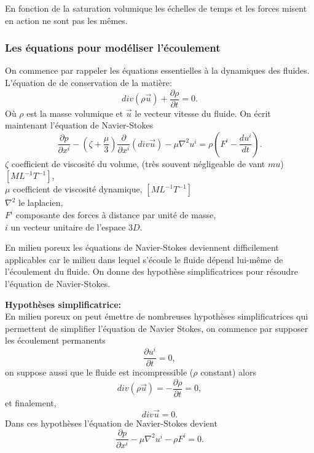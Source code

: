 \documentclass[a4paper,11pt]{article}
\begin{document}
En fonction de la saturation volumique les échelles de temps et les forces misent en action ne sont pas les mêmes.


\subsubsection{Les équations pour modéliser l'écoulement}
\label{darcy}
On commence par rappeler les équations essentielles à la dynamiques des fluides. 
L'équation de de conservation de la matière:
\begin{equation}
	\label{cons-mat}
	div(\rho \overrightarrow{u})+\frac{\partial \rho}{\partial t}=0.
\end{equation}
Où $\rho$ est la masse volumique et $\overrightarrow{u}$ le vecteur vitesse du fluide. On écrit maintenant l'équation de Navier-Stokes
\begin{equation}
	\frac{\partial p}{\partial x^i}-(\zeta+\frac{\mu}{3})\frac{\partial}{\partial x^i}(div\overrightarrow{u}) - \mu \nabla^2u^i=\rho(F^i -\frac{du^i}{dt}).
\end{equation}
$\zeta$ coefficient de viscosité du volume, (très souvent négligeable de vant $mu$) $[ML^{-1}T^{-1}]$,\\
$\mu$ coefficient de viscosité dynamique, $[ML^{-1}T^{-1}]$\\
$\nabla^2$ le laplacien,\\
$F^i$ composante des forces à distance par unité de masse,\\
$i$ un vecteur unitaire de l'espace $3D$.

En milieu poreux les équations de Navier-Stokes deviennent difficilement applicables car le milieu dans lequel s'écoule le fluide dépend lui-même de l'écoulement du fluide. On donne des hypothèse simplificatrices pour résoudre l'équation de Navier-Stokes. 

\vspace{0.7cm}

\noindent \textbf{Hypothèses simplificatrice:}\\
En milieu poreux on peut émettre de nombreuses hypothèses simplificatrices qui permettent de simplifier l'équation de Navier Stokes, on commence par supposer les écoulement permanents
\[\frac{\partial u^i}{\partial t}=0,\]
on suppose aussi que le fluide est incompressible ($\rho$ constant) alors
\[div(\rho \overrightarrow{u})=-\frac{\partial \rho}{\partial t}=0,\]
et finalement,
\[div \overrightarrow{u}=0.\]
Dans ces hypothèses l'équation de Navier-Stokes devient
\begin{equation}
	\label{eq-cons-m-simp}
	\frac{\partial p}{\partial x^i}-\mu \nabla^2u^i-\rho F^i=0. 
\end{equation}
\end{document}
